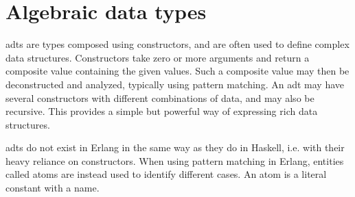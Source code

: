 \section{Algebraic data types}

\Glspl{adt} are types composed using constructors, and are often used to define complex data structures. Constructors take zero or more arguments and return a composite value containing the given values. Such a composite value may then be deconstructed and analyzed, typically using pattern matching. An \gls{adt} may have several constructors with different combinations of data, and may also be recursive. This provides a simple but powerful way of expressing rich data structures.

\Glspl{adt} do not exist in Erlang in the same way as they do in Haskell, i.e. with their heavy reliance on constructors. When using pattern matching in Erlang, entities called atoms are instead used to identify different cases. An atom is a literal constant with a name. 
